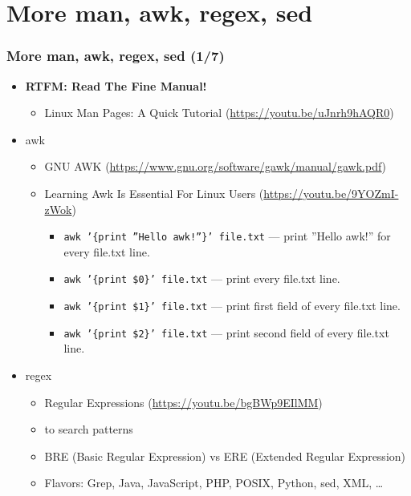 \documentclass[aspectratio=169, xcolor=table, notheorems, hyperref={pdfpagelabels=false}]{beamer}
\begin{document}
\section{More man, awk, regex, sed}
\begin{frame}[fragile]
\frametitle{More man, awk, regex, sed (1/7)}
\begin{itemize}
\item \textbf{RTFM: Read The Fine Manual!}
\begin{itemize}
\item Linux Man Pages: A Quick Tutorial (\url{https://youtu.be/uJnrh9hAQR0})
\end{itemize}
\item awk
\begin{itemize}
\item GNU AWK (\url{https://www.gnu.org/software/gawk/manual/gawk.pdf})
\item Learning Awk Is Essential For Linux Users (\url{https://youtu.be/9YOZmI-zWok})
\begin{itemize}
\item \texttt{awk '\{print ''Hello awk!''\}' file.txt} --- print ''Hello awk!'' for every file.txt line.
\item \texttt{awk '\{print \$0\}' file.txt} --- print every file.txt line.
\item \texttt{awk '\{print \$1\}' file.txt} --- print first field of every file.txt line.
\item \texttt{awk '\{print \$2\}' file.txt} --- print second field of every file.txt line.
\end{itemize}
\end{itemize}
\item regex
\begin{itemize}
\item Regular Expressions (\url{https://youtu.be/bgBWp9EIlMM})
\item to search patterns
\item BRE (Basic Regular Expression) vs ERE (Extended Regular Expression)
\item Flavors: Grep, Java, JavaScript, PHP, POSIX, Python, sed, XML, \ldots
\end{itemize}
\end{itemize}
\end{frame}
\end{document}
